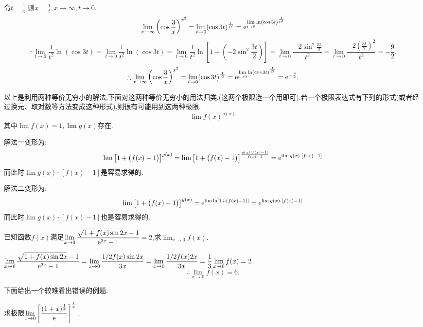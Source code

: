 \solveother 令$\displaystyle t=\frac{1}{x}$,则$\displaystyle x=\frac{1}{t},x\to \infty ,t \to 0.$
\[
\lim_{x \to \infty}\left( \cos \frac{3}{x}\right)^{x^2} =\lim_{t \to 0}(\cos 3t)^{\frac{1}{t^2}}={\rm{e}}^{\lim\limits_{t \to 0}\ln(\cos 3t)^{\frac{1}{t^2}}}
\]
\[
\because \lim\limits_{t \to 0}\frac{1}{t^2}\ln(\cos 3t)=\lim\limits_{t \to 0}\frac{1}{t^2}\ln (\cos 3t)=\lim\limits_{t \to 0}\frac{1}{t^2}\ln \left[1+\left(-2\sin^2\frac{3t}{2}\right)\right]=\lim_{t \to 0}\frac{-2\sin^2\frac{3t}{2}}{t^2}=\lim\limits_{t \to 0}\frac{-2\left(\frac{3t}{2}\right)^2}{t^2}=-\frac{9}{2}.
\]
\[
\therefore \lim_{x \to \infty}\left( \cos \frac{3}{x}\right)^{x^2}=\lim\limits_{t \to 0}(\cos 3t)^{\frac{1}{t^2}}={\rm{e}}^{\lim\limits_{t \to 0}\ln(\cos 3t)^{\frac{1}{t^2}}}={\rm{e}}^{-\frac{9}{2}}.
\]

\inference[等价无穷小类型\uppercase\expandafter{\romannumeral1}]
以上是利用两种等价无穷小的解法,下面对这两种等价无穷小的用法归类.(这两个极限选一个用即可).若一个极限表达式有下列的形式(或者经过换元、取对数等方法变成这种形式),则很有可能用到这两种极限.
\begin{equation}
\lim f(x)^{g(x)}
\end{equation}
其中$\lim f(x)=1,\lim g(x)$存在.

解法一\qquad 变形为:
\begin{equation}
	\lim\big[1+\big(f(x)-1\big)\big]^{g(x)}=\lim\big[1+\big(f(x)-1\big)\big]^{\frac{g(x)[f(x)-1]}{f(x)-1}}={\rm{e}}^{\lim g(x)\cdot [f(x)-1]}
\end{equation}
而此时$\lim g(x) \cdot [f(x)-1]$是容易求得的.


解法二\qquad 变形为:
\begin{equation}
\lim\big[1+\big(f(x)-1\big)\big]^{g(x)}={\rm{e}}^{\lim \ln[1+\left( f(x)-1\right) ]}={\rm{e}}^{\lim g(x)\cdot [f(x)-1]}
\end{equation}
而此时$\lim g(x) \cdot [f(x)-1]$也是容易求得的.

\examples 已知函数$f(x)$满足$\displaystyle \lim_{x \to 0}\frac{\sqrt{1+f(x)\sin 2x}-1}{{\rm{e}}^{3x}-1}=2$,求$\displaystyle \lim_{x \to 0}f(x).$

\solve $\displaystyle \lim_{x \to 0}\frac{\sqrt{1+f(x)\sin 2x}-1}{{\rm{e}}^{3x}-1}=\lim\limits_{x \to 0}\frac{1/2f(x)\sin 2x}{3x}=\lim_{x \to 0}\frac{1/2f(x)2x}{3x}=\frac{1}{3}\lim_{x\to 0}f(x)=2.$
\[
\therefore \lim_{x \to 0}f(x)=6.
\]

下面给出一个较难看出错误的例题.

\examples \label{例 1.12}求极限$\displaystyle \lim_{x \to 0}\left[ \frac{(1+x)^{\frac{1}{x}}}{{\rm{e}}}\right]^{\frac{1}{x}}.$

